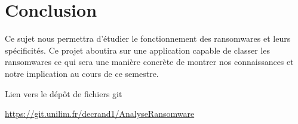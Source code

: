 \documentclass[11pt]{article}
\begin{document}
\section{Conclusion}
Ce sujet nous permettra d'étudier le fonctionnement des ransomwares et leurs spécificités. Ce projet aboutira sur une application capable de classer les ransomwares ce qui sera une manière concrète de montrer nos connaissances et notre implication au cours de ce semestre.



\newpage
Lien vers le dépôt de fichiers git

\url{https://git.unilim.fr/decrand1/AnalyseRansomware}

\printglossaries
 
 
\end{document}
